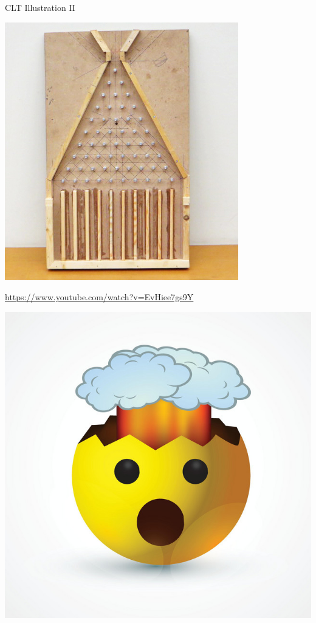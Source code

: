 \documentclass[11pt,english,handout]{beamer}
\begin{document}
\begin{frame}{CLT Illustration II}
	\begin{center}
		\includegraphics[width = 0.5\linewidth]{Galton_Board}
	\end{center}
	\href{https://www.youtube.com/watch?v=EvHiee7gs9Y}{https://www.youtube.com/watch?v=EvHiee7gs9Y}
\end{frame}


\begin{frame}
	\centering
	\includegraphics[width = 0.5\linewidth]{mind-blown}
\end{frame}
\end{document}

